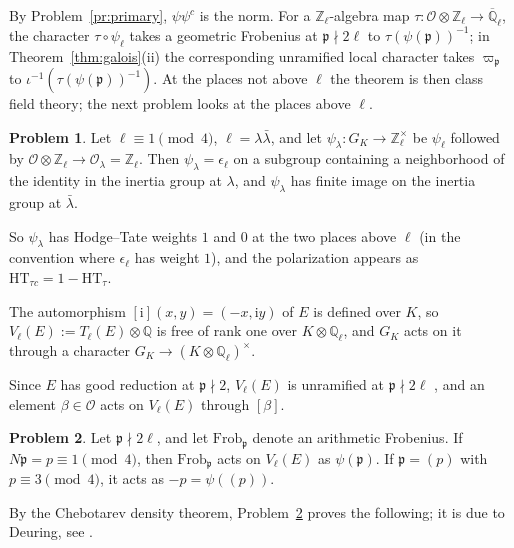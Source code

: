 \documentclass[reqno]{amsart}
\theoremstyle{definition}
\newtheorem{problem}{Problem}[section]
\theoremstyle{plain}
\newcommand{\Z}{\mathbb{Z}}
\newcommand{\Q}{\mathbb{Q}}
\newcommand{\Qlb}{\overline{\Q}_\ell}
\newcommand{\Oc}{\mathcal{O}}
\newcommand{\Frob}{\mathrm{Frob}}
\newcommand{\ii}{\mathrm{i}}
\begin{document}
By Problem~\ref{pr:primary}, \(\psi\psi^c\) is the norm.  For a \(\Z_\ell\)-algebra map \(\tau \colon \Oc \otimes \Z_\ell \to \Qlb\), the character \(\tau \circ \psi_\ell\) takes a geometric Frobenius at \(\mathfrak{p} \nmid 2\ell\) to \(\tau(\psi(\mathfrak{p}))^{-1}\); in Theorem~\ref{thm:galois}(ii) the corresponding unramified local character takes \(\varpi_\mathfrak{p}\) to \(\iota^{-1}(\tau(\psi(\mathfrak{p}))^{-1})\).  At the places not above \(\ell\) the theorem is then class field theory; the next problem looks at the places above \(\ell\).

\begin{problem}\label{pr:HT}
Let \(\ell \equiv 1 \pmod 4\), \(\ell = \lambda\bar\lambda\), and let \(\psi_\lambda \colon G_K \to \Z_\ell^\times\) be \(\psi_\ell\) followed by \(\Oc \otimes \Z_\ell \to \Oc_\lambda = \Z_\ell\).  Then \(\psi_\lambda = \epsilon_\ell\) on a subgroup containing a neighborhood of the identity in the inertia group at \(\lambda\), and \(\psi_\lambda\) has finite image on the inertia group at \(\bar\lambda\).
\end{problem}

So \(\psi_\lambda\) has Hodge--Tate weights \(1\) and \(0\) at the two places above \(\ell\) (in the convention where \(\epsilon_\ell\) has weight \(1\)), and the polarization appears as \(\mathrm{HT}_{\tau c} = 1 - \mathrm{HT}_\tau\).

The automorphism \([\ii](x, y) = (-x, \ii y)\) of \(E\) is defined over \(K\), so \(V_\ell(E) := T_\ell(E) \otimes \Q\) is free of rank one over \(K \otimes \Q_\ell\), and \(G_K\) acts on it through a character \(G_K \to (K \otimes \Q_\ell)^\times\).

Since \(E\) has good reduction at \(\mathfrak{p} \nmid 2\), \(V_\ell(E)\) is unramified at \(\mathfrak{p} \nmid 2\ell\) \cite[\S VII.4]{Si1}, and an element \(\beta \in \Oc\) acts on \(V_\ell(E)\) through \([\beta]\).

\begin{problem}\label{pr:frob-cm}
Let \(\mathfrak{p} \nmid 2\ell\), and let \(\Frob_\mathfrak{p}\) denote an arithmetic Frobenius.  If \(N\mathfrak{p} = p \equiv 1 \pmod 4\), then \(\Frob_\mathfrak{p}\) acts on \(V_\ell(E)\) as \(\psi(\mathfrak{p})\).  If \(\mathfrak{p} = (p)\) with \(p \equiv 3 \pmod 4\), it acts as \(-p = \psi((p))\).
\end{problem}

By the Chebotarev density theorem, Problem~\ref{pr:frob-cm} proves the following; it is due to Deuring, see \cite[Ch.~II, \S10]{Si2}.
\end{document}
